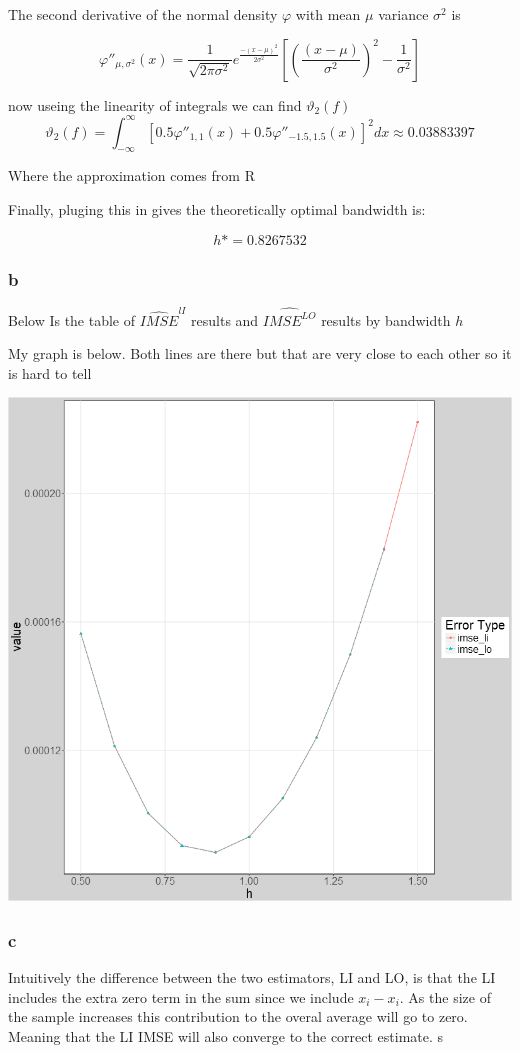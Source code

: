 \documentclass[11pt]{article}
\begin{document}
The second derivative of the normal density $\varphi$ with mean $\mu$ variance $\sigma^2$ is 

$$\varphi''_{\mu, \sigma^2}(x) = \frac{1}{\sqrt{2 \pi \sigma^2 }}e^{\frac{-(x-\mu)^2}{2\sigma^2}} \left[ \left( \frac{(x - \mu)}{\sigma^2} \right)^2 - \frac{1}{\sigma^2} \right]
$$

now useing the linearity of integrals we can find $\vartheta_{2}(f)$
$$ \vartheta_{2}(f) = \int_{-\infty}^{\infty} [0.5 \varphi''_{1,1}(x) + 0.5 \varphi''_{-1.5, 1.5}(x)]^2dx \approx 0.03883397
$$

Where the approximation comes from R 

Finally, pluging this in gives the theoretically optimal bandwidth is: 

$$h* = 0.8267532
$$

\subsubsection{b}

Below Is the table of $\widehat{IMSE}^{lI}$ results and $\widehat{IMSE^{LO}}$ results by bandwidth $h$ 

\begin{center}
	
\end{center}

My graph is below. Both lines are there but that are very close to each other so it is hard to tell 

\begin{center}
		\includegraphics[width=.6\linewidth]{plot_1_3_b.png}

\end{center}


\subsubsection{c}
Intuitively the difference between the two estimators, LI and LO, is that the LI includes the extra zero term in the sum since we include $x_i - x_i$. As the size of the sample increases this contribution to the overal average will go to zero. Meaning that the LI IMSE will also converge to the correct estimate. s
\end{document}
